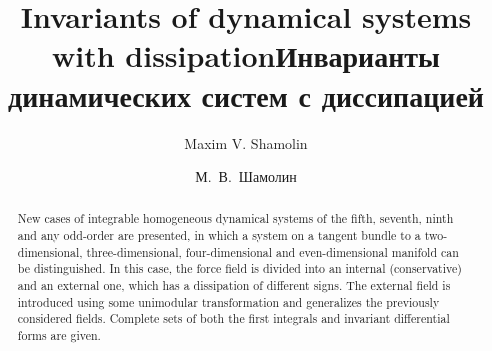 \begin{englishtitle} %
\title{Invariants of dynamical systems with dissipation}
\author{Maxim V. Shamolin 
}

\maketitle

\begin{abstract}
New cases of integrable homogeneous dynamical systems of the fifth, seventh, ninth and any odd-order are presented, in which a system on a tangent bundle to a two-dimensional, three-dimensional, four-dimensional and even-dimensional manifold can be distinguished. In this case, the force field is divided into an internal (conservative) and an external one, which has a dissipation of different signs. The external field is introduced using some unimodular transformation and generalizes the previously considered fields. Complete sets of both the first integrals and invariant differential forms are given.

\end{abstract}
\end{englishtitle}

\iffalse
\documentclass[12pt]{llncs}


\usepackage{iftex}

\ifPDFTeX
\usepackage[T2A]{fontenc}
\usepackage[utf8]{inputenc} %
\usepackage[english,russian]{babel}
\fi

\usepackage{todonotes}

\usepackage[russian]{nla}


\fi
%

\title{Инварианты динамических систем с диссипацией}
\author{М.~В.~Шамолин   %
} %

